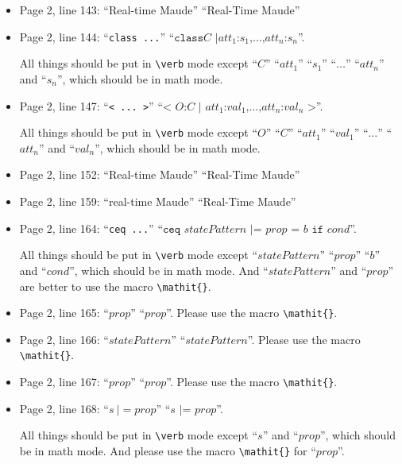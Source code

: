 \documentclass[12pt,onecolumn]{IEEEtranTIE}
\begin{document}
\begin{itemize}
\item Page 2, line 143: ``Real-time Maude'' \by ``Real-Time Maude''

\item Page 2, line 144: ``\verb|class ...|'' \by ``$\texttt{class
}C\texttt{ |
}att_1\texttt{:}s_1\texttt{,}\ldots\texttt{,}att_n\texttt{:}s_n$''.

All things should be put in \verb|\verb| mode except ``$C$''
``$att_1$'' ``$s_1$'' ``$\ldots$'' ``$att_n$'' and ``$s_n$'', which
should be in math mode.

\item Page 2, line 147: ``\verb|< ... >|'' \by ``$\texttt{< }
  O\texttt{:} C \texttt{ | } att_1\texttt{:}val_1\texttt{,} \ldots
  \texttt{,}att_n\texttt{:}val_n\texttt{ >}$''. 

All things should be put in \verb|\verb| mode except ``$O$'' ``$C$''
``$att_1$'' ``$val_1$'' ``$\ldots$'' ``$att_n$'' and ``$val_n$'',
which should be in math mode.

\item Page 2, line 152: ``Real-time Maude'' \by ``Real-Time Maude''

\item Page 2, line 159: ``real-time Maude'' \by ``Real-Time Maude''

\item Page 2, line 164: ``\verb|ceq ...|'' \by ``$\texttt{ceq }
  \mathit{statePattern} \texttt{ |= } \mathit{prop} \texttt{ = } b
  \texttt{ if } cond$''.

All things should be put in \verb|\verb| mode except
``$\mathit{statePattern}$'' ``$\mathit{prop}$'' ``$b$'' and
``$cond$'', which should be in math mode. And ``$\mathit{statePattern}$''
and ``$\mathit{prop}$'' are better to use the macro \verb|\mathit{}|.

\item Page 2, line 165: ``$prop$'' \by ``$\mathit{prop}$''. Please use the
  macro \verb|\mathit{}|.

\item Page 2, line 166: ``$statePattern$'' \by
  ``$\mathit{statePattern}$''. Please use the macro \verb|\mathit{}|.

\item Page 2, line 167: ``$prop$'' \by ``$\mathit{prop}$''. Please use the
  macro \verb|\mathit{}|.

\item Page 2, line 168: ``$s~|= prop$'' \by ``$s \texttt{ |= }
  \mathit{prop}$''.

All things should be put in \verb|\verb| mode except ``$s$'' and
``$\mathit{prop}$'', which should be in math mode. And please use the
macro \verb|\mathit{}| for ``$\mathit{prop}$''.


\end{itemize}
\end{document}
